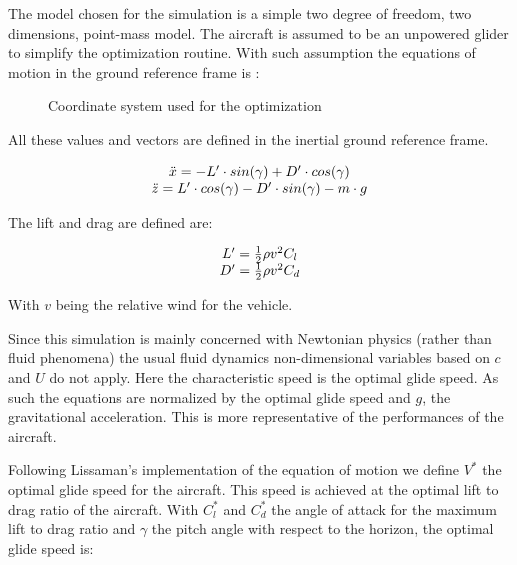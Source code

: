 
The model chosen for the simulation is a simple two degree of freedom, two dimensions, point-mass model. 
The aircraft is assumed to be an unpowered glider to simplify the optimization routine. 
With such assumption the equations of motion in the ground reference frame is :

\begin{figure}[h]
  \centering
  \caption{Coordinate system used for the optimization}
\end{figure}

All these values and vectors are defined in the inertial ground reference frame.

\begin{equation}
\begin{array}[c]{c}
  \ddot{x}= -L' \cdot sin(\gamma) + D' \cdot cos(\gamma) \\ 
  \ddot{z}= L' \cdot cos(\gamma) - D' \cdot sin(\gamma) - m \cdot g
\end{array}
\label{eqn:eqm}
\end{equation}


\par The lift and drag are defined are: 

\begin{equation}
\begin{array}[c]{c}
  L'= \frac{1}{2} \rho v^2 C_l \\ 
  D'= \frac{1}{2} \rho v^2 C_d 
\end{array}
\label{eqn:Cl_def}
\end{equation}

\par With $v$ being the relative wind for the vehicle.

\par Since this simulation is mainly concerned with Newtonian physics (rather than fluid phenomena) the usual fluid dynamics non-dimensional variables based on $c$ and $U$ do not apply.
Here the characteristic speed is the optimal glide speed.
As such the equations are normalized by the optimal glide speed and $g$, the gravitational acceleration.
This is more representative of the performances of the aircraft.

\par Following Lissaman's \cite{lissaman2005wind} implementation of the equation of motion we define $V^*$ the optimal glide speed for the aircraft. 
This speed is achieved at the optimal lift to drag ratio of the aircraft.
With $C_l^*$ and $C_d^*$ the angle of attack for the maximum lift to drag ratio and $\gamma$ the pitch angle with respect to the horizon, the optimal glide speed is:

